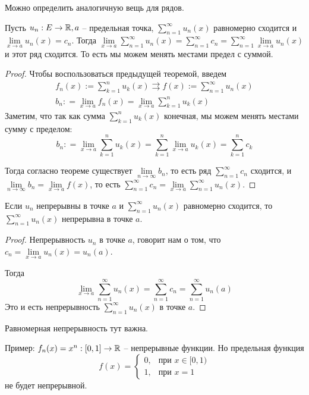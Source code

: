 \vspace*{7mm}

Можно определить аналогичную вещь для рядов.

 \begin{theorem}
     Пусть $u_n: E \to \mathbb{R}, a$ -- предельная точка, $\sum\limits_{n=1}^\infty u_n(x)$ равномерно сходится и $\lim\limits_{x \to a} u_n(x) = c_n$.
     Тогда $\lim\limits_{x \to a} \sum\limits_{n=1}^\infty u_n(x) = \sum\limits_{n=1}^\infty c_n = \sum\limits_{n=1}^\infty \lim\limits_{x \to a} u_n(x)$ и этот ряд сходится.
     То есть мы можем менять местами предел с суммой.
 \end{theorem}
 \begin{proof}
    Чтобы воспользоваться предыдущей теоремой, введем 
    \begin{gather*}
        f_n(x) := \sum\limits_{k=1}^n u_k(x) \rightrightarrows f(x) := \sum_{n=1}^\infty u_n(x) \\
        b_n: = \lim_{x \to a} f_n(x) = \lim_{x \to a} \sum_{k=1}^n u_k(x)
    \end{gather*}
    \quad Заметим, что так как сумма $\sum\limits_{k=1}^n u_k(x)$ конечная, мы можем менять местами сумму с пределом:
    \[ b_n: = \lim_{x \to a} \sum_{k=1}^n u_k(x) = \sum_{k=1}^n \lim_{x \to a} u_k(x) = \sum_{k=1}^n c_k  \]
    
    \quad Тогда согласно теореме существует $\lim\limits_{n \to \infty} b_n$, то есть ряд $\sum\limits_{n = 1}^\infty c_n$ сходится, и $\lim\limits_{n \to \infty} b_n = \lim\limits_{x \to a} f(x)$, то есть $\sum\limits_{n = 1}^\infty c_n = \lim\limits_{x \to a} \sum\limits_{n = 1}^\infty u_n(x)$.
 \end{proof}
 \begin{follow}
     Если $u_n$ непрерывны в точке $a$ и $\sum\limits_{n = 1}^\infty u_n(x)$ равномерно сходится, то $\sum\limits_{n = 1}^\infty u_n(x)$ непрерывна в точке $a$.
 \end{follow}
\begin{proof}
    Непрерывность $u_n$ в точке $a$, говорит нам о том, что $c_n = \lim\limits_{x \to a} u_n(x) = u_n(a)$.

    \quad Тогда \[ \lim\limits_{x \to a} \sum\limits_{n=1}^\infty u_n(x) = \sum\limits_{n=1}^\infty c_n = \sum\limits_{n=1}^\infty u_n(a)   \]
    \quad Это и есть непрерывность $\sum\limits_{n = 1}^\infty u_n(x)$ в точке $a$.
\end{proof}

\begin{notice}
    Равномерная непрерывность тут важна. 

    Пример: $f_n(x) = x^n : [0, 1] \to \mathbb{R}$ -- непрерывные функции. Но предельная функция \[ f(x) = \begin{cases}
        0, & \text{при $x \in [0, 1)$} \\
        1, & \text{при $x = 1$}
    \end{cases} \]
    не будет непрерывной.
 \end{notice}

